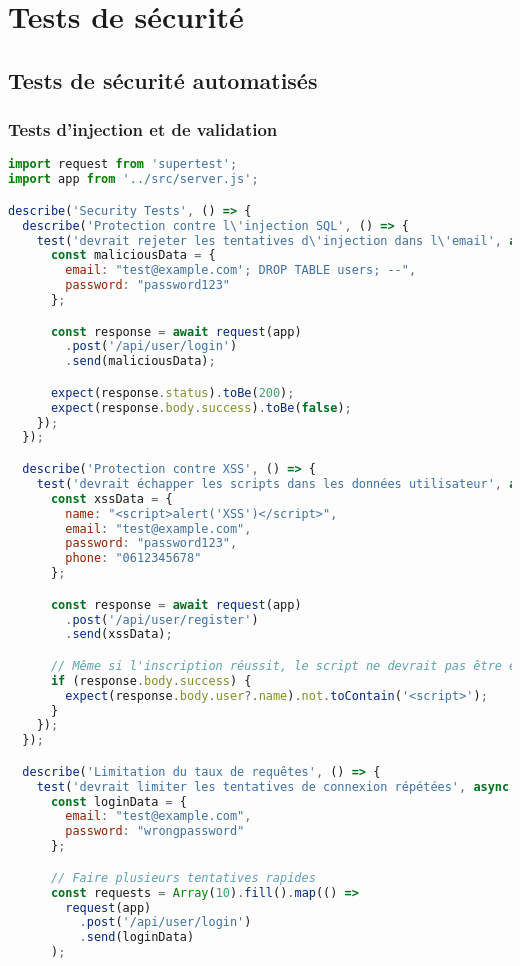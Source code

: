 \section{Tests de sécurité}

\subsection{Tests de sécurité automatisés}

\subsubsection{Tests d'injection et de validation}

\begin{lstlisting}[language=JavaScript, caption=security.test.js]
import request from 'supertest';
import app from '../src/server.js';

describe('Security Tests', () => {
  describe('Protection contre l\'injection SQL', () => {
    test('devrait rejeter les tentatives d\'injection dans l\'email', async () => {
      const maliciousData = {
        email: "test@example.com'; DROP TABLE users; --",
        password: "password123"
      };

      const response = await request(app)
        .post('/api/user/login')
        .send(maliciousData);

      expect(response.status).toBe(200);
      expect(response.body.success).toBe(false);
    });
  });

  describe('Protection contre XSS', () => {
    test('devrait échapper les scripts dans les données utilisateur', async () => {
      const xssData = {
        name: "<script>alert('XSS')</script>",
        email: "test@example.com",
        password: "password123",
        phone: "0612345678"
      };

      const response = await request(app)
        .post('/api/user/register')
        .send(xssData);

      // Même si l'inscription réussit, le script ne devrait pas être exécuté
      if (response.body.success) {
        expect(response.body.user?.name).not.toContain('<script>');
      }
    });
  });

  describe('Limitation du taux de requêtes', () => {
    test('devrait limiter les tentatives de connexion répétées', async () => {
      const loginData = {
        email: "test@example.com",
        password: "wrongpassword"
      };

      // Faire plusieurs tentatives rapides
      const requests = Array(10).fill().map(() =>
        request(app)
          .post('/api/user/login')
          .send(loginData)
      );


\end{lstlisting}
